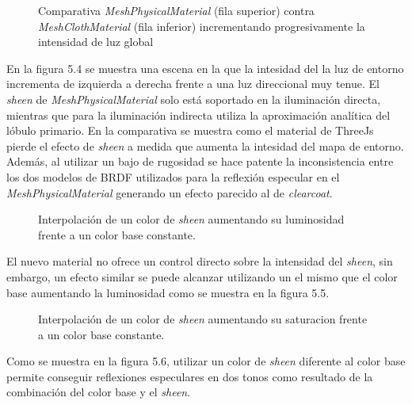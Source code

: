 \begin{figure}[H]
  \vspace{0.5cm}
  \centering
  \caption{Comparativa \textit{MeshPhysicalMaterial} (fila superior) contra \textit{MeshClothMaterial} (fila inferior) incrementando
  progresivamente la intensidad de luz global}
\end{figure}

En la figura 5.4 se muestra una escena en la que la intesidad del la luz de entorno incrementa de izquierda a derecha
frente a una luz direccional muy tenue. El \textit{sheen} de \textit{MeshPhysicalMaterial} solo est\'a soportado en la
iluminaci\'on directa, mientras que para la iluminaci\'on indirecta utiliza la aproximaci\'on anal\'itica del l\'obulo primario.
En la comparativa se muestra como el material de ThreeJs pierde el efecto de \textit{sheen} a medida que aumenta la intesidad
del mapa de entorno. Adem\'as, al utilizar un bajo de rugosidad se hace patente la inconsistencia entre los dos modelos de BRDF
utilizados para la reflexi\'on especular en el \textit{MeshPhysicalMaterial} generando un efecto parecido al de \textit{clearcoat}.



\begin{figure}[H]
  \vspace{0.5cm}
  \centering
  \caption{Interpolaci\'on de un color de \textit{sheen} aumentando su luminosidad frente a un color base constante.}
\end{figure}

El nuevo material no ofrece un control directo sobre la intensidad del \textit{sheen}, sin embargo, un efecto similar se puede
alcanzar utilizando un el mismo que el color base aumentando la luminosidad como se muestra en la figura 5.5.

\begin{figure}[H]
  \vspace{0.5cm}
  \centering
  \caption{Interpolaci\'on de un color de \textit{sheen} aumentando su saturacion frente a un color base constante.}
\end{figure}
\singlespacing

Como se muestra en la figura 5.6, utilizar un color de \textit{sheen} diferente al color base permite conseguir reflexiones especulares
en dos tonos como resultado de la combinaci\'on del color base y el \textit{sheen}.

